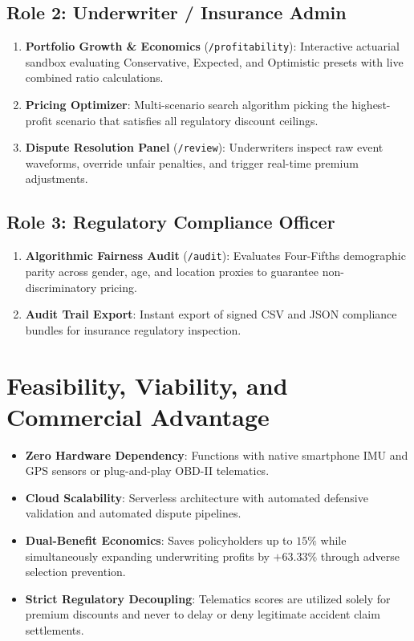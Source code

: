 \documentclass[11pt,a4paper]{article}
\begin{document}
\subsection{Role 2: Underwriter / Insurance Admin}
\begin{enumerate}[noitemsep]
    \item \textbf{Portfolio Growth \& Economics} (\texttt{/profitability}): Interactive actuarial sandbox evaluating Conservative, Expected, and Optimistic presets with live combined ratio calculations.
    \item \textbf{Pricing Optimizer}: Multi-scenario search algorithm picking the highest-profit scenario that satisfies all regulatory discount ceilings.
    \item \textbf{Dispute Resolution Panel} (\texttt{/review}): Underwriters inspect raw event waveforms, override unfair penalties, and trigger real-time premium adjustments.
\end{enumerate}

\subsection{Role 3: Regulatory Compliance Officer}
\begin{enumerate}[noitemsep]
    \item \textbf{Algorithmic Fairness Audit} (\texttt{/audit}): Evaluates Four-Fifths demographic parity across gender, age, and location proxies to guarantee non-discriminatory pricing.
    \item \textbf{Audit Trail Export}: Instant export of signed CSV and JSON compliance bundles for insurance regulatory inspection.
\end{enumerate}

\section{Feasibility, Viability, and Commercial Advantage}
\begin{itemize}[noitemsep]
    \item \textbf{Zero Hardware Dependency}: Functions with native smartphone IMU and GPS sensors or plug-and-play OBD-II telematics.
    \item \textbf{Cloud Scalability}: Serverless architecture with automated defensive validation and automated dispute pipelines.
    \item \textbf{Dual-Benefit Economics}: Saves policyholders up to $15\%$ while simultaneously expanding underwriting profits by $+63.33\%$ through adverse selection prevention.
    \item \textbf{Strict Regulatory Decoupling}: Telematics scores are utilized solely for premium discounts and never to delay or deny legitimate accident claim settlements.
\end{itemize}
\end{document}
